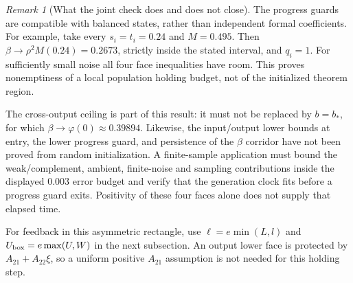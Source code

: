 \documentclass{article} %
\theoremstyle{plain}
\theoremstyle{definition}
\theoremstyle{remark}
\newtheorem{remark}[theorem]{Remark}
\begin{document}
\begin{remark}[What the joint check does and does not close]
The progress guards are compatible with balanced states, rather than
independent formal coefficients. For example, take every $s_i=t_i=0.24$
and $M=0.495$. Then $\beta\to\rho^2M(0.24)=0.2673$, strictly inside
the stated interval, and $q_i=1$. For sufficiently small noise all four
face inequalities have room. This proves nonemptiness of a local
population holding budget, not of the initialized theorem region.

The cross-output ceiling is part of this result: it must not be replaced
by $b=b_*$, for which $\beta\to\varphi(0)\approx0.39894$.
Likewise, the input/output lower bounds at entry, the lower progress
guard, and persistence of the $\beta$ corridor have not been proved
from random initialization. A finite-sample application must bound the
weak/complement, ambient, finite-noise and sampling contributions inside
the displayed $0.003$ error budget and verify that the generation clock
fits before a progress guard exits. Positivity of these four faces alone
does not supply that elapsed time.

For feedback in this asymmetric rectangle, use
$\ell=e\min(L,l)$ and $U_{\rm box}=e\max(U,W)$ in the next subsection.
An output lower face is protected by $A_{21}+A_{22}\xi$, so a uniform
positive $A_{21}$ assumption is not needed for this holding step.
\end{remark}
\end{document}
